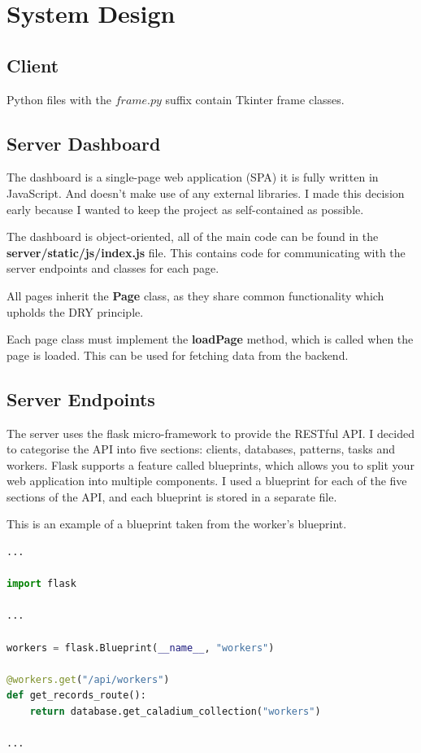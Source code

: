 \chapter{System Design}

\section{Client}
Python files with the $frame.py$ suffix contain Tkinter frame classes.

\section{Server Dashboard}
The dashboard is a single-page web application (SPA) it is fully written in JavaScript.
And doesn't make use of any external libraries.
I made this decision early because I wanted to keep the project as self-contained as possible.

The dashboard is object-oriented, all of the main code can be found in the \textbf{server/static/js/index.js} file.
This contains code for communicating with the server endpoints and classes for each page.

All pages inherit the \textbf{Page} class, as they share common functionality which upholds the DRY principle.


Each page class must implement the \textbf{loadPage} method, which is called when the page is loaded.
This can be used for fetching data from the backend.



\section{Server Endpoints}
The server uses the flask micro-framework to provide the RESTful API.
I decided to categorise the API into five sections: clients, databases, patterns, tasks and workers.
Flask supports a feature called blueprints, which allows you to split your web application into multiple components.
I used a blueprint for each of the five sections of the API, and each blueprint is stored in a separate file.

This is an example of a blueprint taken from the worker's blueprint.
\begin{lstlisting}[language=python]
...

import flask

...

workers = flask.Blueprint(__name__, "workers")

@workers.get("/api/workers")
def get_records_route():
    return database.get_caladium_collection("workers")

...
\end{lstlisting}

